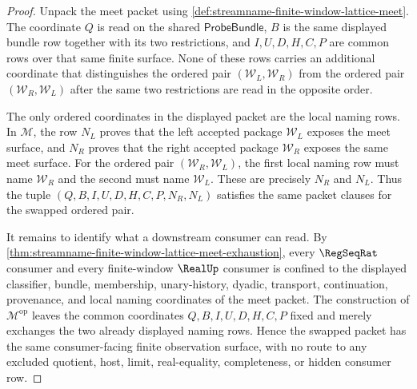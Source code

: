 \begin{proof}
Unpack the meet packet using
\autoref{def:streamname-finite-window-lattice-meet}. The coordinate $Q$ is
read on the shared $\mathsf{ProbeBundle}$, $B$ is the same displayed bundle
row together with its two restrictions, and $I,U,D,H,C,P$ are common rows over
that same finite surface. None of these rows carries an additional coordinate
that distinguishes the ordered pair $(\mathcal W_L,\mathcal W_R)$ from the
ordered pair $(\mathcal W_R,\mathcal W_L)$ after the same two restrictions
are read in the opposite order.

The only ordered coordinates in the displayed packet are the local naming
rows. In $\mathcal M$, the row $N_L$ proves that the left accepted package
$\mathcal W_L$ exposes the meet surface, and $N_R$ proves that the right
accepted package $\mathcal W_R$ exposes the same meet surface. For the ordered
pair $(\mathcal W_R,\mathcal W_L)$, the first local naming row must name
$\mathcal W_R$ and the second must name $\mathcal W_L$. These are precisely
$N_R$ and $N_L$. Thus the tuple
$(Q,B,I,U,D,H,C,P,N_R,N_L)$ satisfies the same packet clauses for the swapped
ordered pair.

It remains to identify what a downstream consumer can read. By
\autoref{thm:streamname-finite-window-lattice-meet-exhaustion}, every
$\RegSeqRat$ consumer and every finite-window $\RealUp$ consumer is confined
to the displayed classifier, bundle, membership, unary-history, dyadic,
transport, continuation, provenance, and local naming coordinates of the meet
packet. The construction of $\mathcal M^{\mathrm{op}}$ leaves the common
coordinates $Q,B,I,U,D,H,C,P$ fixed and merely exchanges the two already
displayed naming rows. Hence the swapped packet has the same consumer-facing
finite observation surface, with no route to any excluded quotient, host,
limit, real-equality, completeness, or hidden consumer row.
\end{proof}
